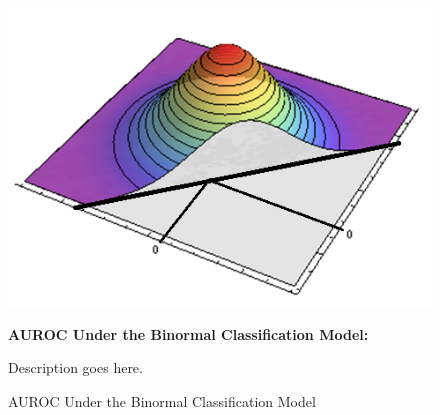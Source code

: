 


\begin{figure}[h!]

\begin{center}

    \caption{AUROC Under the Binormal Classification Model} \label{fig:binorm1}

    \includegraphics[scale=  0.500000]{Figs/Binormal/BivariateNormal1.png}

\end{center}

\footnotesize

    \textbf{AUROC Under the Binormal Classification Model:}

    Description goes here.

\end{figure}




